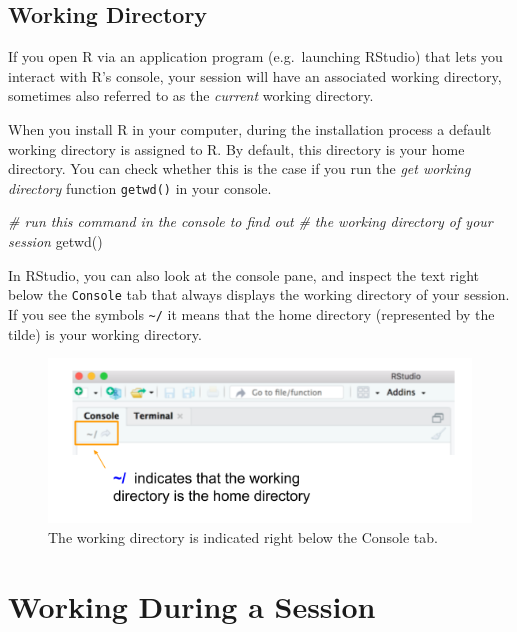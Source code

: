 \documentclass[
]{book}
\newenvironment{Shaded}{\begin{snugshade}}{\end{snugshade}}
\newcommand{\CommentTok}[1]{\textcolor[rgb]{0.56,0.35,0.01}{\textit{#1}}}
\newcommand{\FunctionTok}[1]{\textcolor[rgb]{0.00,0.00,0.00}{#1}}
\newcommand{\NormalTok}[1]{#1}
\begin{document}
\hypertarget{working-directory}{%
\subsection{Working Directory}\label{working-directory}}

If you open R via an application program (e.g.~launching RStudio) that lets
you interact with R's console, your session will have an associated working
directory, sometimes also referred to as the \emph{current} working directory.

When you install R in your computer, during the installation process a default
working directory is assigned to R. By default, this directory is your home
directory. You can check whether this is the case if you run the
\emph{get working directory} function \texttt{getwd()} in your console.

\begin{Shaded}
\begin{Highlighting}[]
\CommentTok{\# run this command in the console to find out }
\CommentTok{\# the working directory of your session}
\FunctionTok{getwd}\NormalTok{()}
\end{Highlighting}
\end{Shaded}

In RStudio, you can also look at the console pane, and inspect the text right
below the \texttt{Console} tab that always displays the working directory of your
session. If you see the symbols \texttt{\textasciitilde{}/} it means that the home directory
(represented by the tilde) is your working directory.

\begin{figure}

{\centering \includegraphics[width=0.7\linewidth]{images/rstudio/rstudio-console-working-directory} 

}

\caption{The working directory is indicated right below the Console tab.}\label{fig:unnamed-chunk-33}
\end{figure}

\hypertarget{working-during-a-session}{%
\section{Working During a Session}\label{working-during-a-session}}
\end{document}
